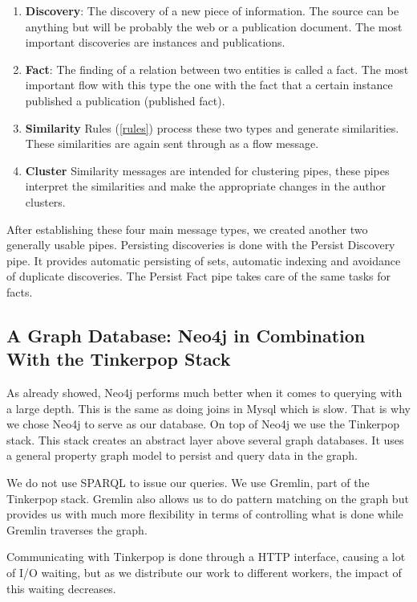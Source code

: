 \begin{enumerate}
\item \textbf{Discovery}: The discovery of a new piece of information. The source can be anything but will be probably the web or a publication document. The most important discoveries are instances and publications.
\item \textbf{Fact}: The finding of a relation between two entities is called a fact. The most important flow with this type the one with the fact that a certain instance published a publication (published fact).
\item \textbf{Similarity} Rules (\autoref{rules}) process these two types and generate similarities. These similarities are again sent through as a flow message.
\item \textbf{Cluster} Similarity messages are intended for clustering pipes, these pipes interpret the similarities and make the appropriate changes in the author clusters.
\end{enumerate}

After establishing these four main message types, we created another two generally usable pipes. Persisting discoveries is done with the Persist Discovery pipe. It provides automatic persisting of sets, automatic indexing and avoidance of duplicate discoveries. The Persist Fact pipe takes care of the same tasks for facts.

\subsection{A Graph Database: Neo4j in Combination With the Tinkerpop Stack}

As already showed, Neo4j performs much better when it comes to querying with a large depth. This is the same as doing joins in Mysql which is slow. That is why we chose Neo4j to serve as our database. On top of Neo4j we use the Tinkerpop stack. This stack creates an abstract layer above several graph databases. It uses a general property graph model to persist and query data in the graph.

We do not use SPARQL to issue our queries. We use Gremlin, part of the Tinkerpop stack. Gremlin also allows us to do pattern matching on the graph but provides us with much more flexibility in terms of controlling what is done while Gremlin traverses the graph.

Communicating with Tinkerpop is done through a HTTP interface, causing a lot of I/O waiting, but as we distribute our work to different workers, the impact of this waiting decreases.

